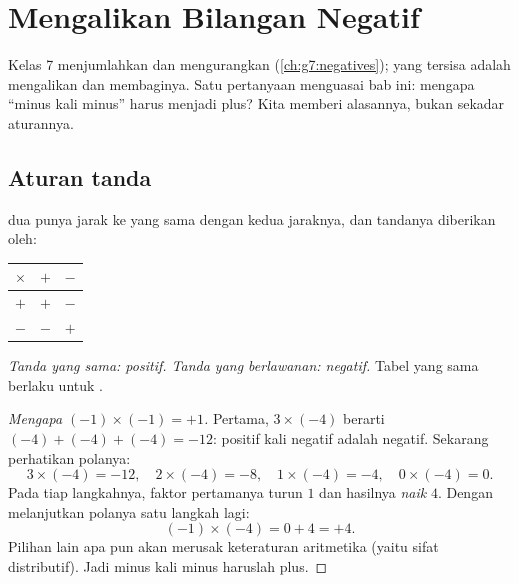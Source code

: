 \chapter{Mengalikan Bilangan Negatif}\label{ch:g8:negprod}

Kelas 7 menjumlahkan dan mengurangkan 
(\cref{ch:g7:negatives}); yang tersisa adalah mengalikan dan
membaginya. Satu pertanyaan menguasai bab ini: mengapa ``minus kali
minus'' harus menjadi plus? Kita memberi alasannya, bukan sekadar
aturannya.

\section{Aturan tanda}

\begin{theorem}\label{thm:g8:negprod:rules}
 dua  punya jarak ke  yang sama dengan
 kedua jaraknya, dan tandanya diberikan oleh:
\begin{center}
\renewcommand{\arraystretch}{1.3}
\begin{tabular}{c|cc}
$\times$ & $+$ & $-$ \\
\hline
$+$ & $+$ & $-$ \\
$-$ & $-$ & $+$ \\
\end{tabular}
\end{center}
\emph{Tanda yang sama:  positif. Tanda yang berlawanan:
 negatif.} Tabel yang sama berlaku untuk .
\end{theorem}

\begin{proof}[Mengapa $(-1) \times (-1) = +1$]
Pertama, $3 \times (-4)$ berarti $(-4) + (-4) + (-4) = -12$: positif
kali negatif adalah negatif. Sekarang perhatikan polanya:
\[
3 \times (-4) = -12, \quad
2 \times (-4) = -8, \quad
1 \times (-4) = -4, \quad
0 \times (-4) = 0 .
\]
Pada tiap langkahnya, faktor pertamanya turun $1$ dan hasilnya
\emph{naik} $4$. Dengan melanjutkan polanya satu langkah lagi:
\[
(-1) \times (-4) = 0 + 4 = +4 .
\]
Pilihan lain apa pun akan merusak keteraturan aritmetika (yaitu sifat
distributif). Jadi minus kali minus haruslah plus.
\end{proof}


